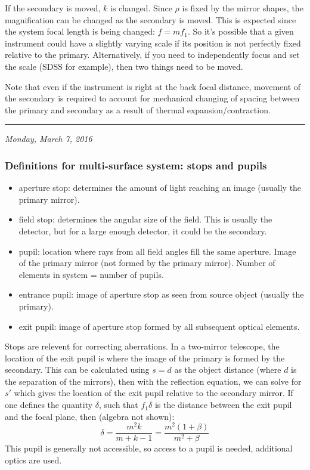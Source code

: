 \documentclass[12pt]{article}
\begin{document}
If the secondary is moved, $k$ is changed. Since $\rho$ is fixed by the
mirror shapes, the magnification can be changed as the secondary is
moved. This is expected since the system focal length is being changed:
$f = mf_{1}$. So it's possible that a given
instrument could have a slightly varying scale if its position is not
perfectly fixed relative to the primary.
Alternatively, if you need to independently focus and set the scale
(SDSS for example), then two things need to be moved.

Note that even if the instrument is right at the back focal
distance, movement of the secondary is required to account for
mechanical changing of spacing between the primary and secondary as a
result of thermal expansion/contraction.

\rule{\textwidth}{0.4pt}

{\small\hfill\emph{Monday, March 7, 2016}}
\subsubsection{Definitions for multi-surface system: stops and pupils}
\begin{itemize}
    \item aperture stop: determines the amount of light reaching an
        image (usually the primary mirror).
    \item field stop: determines the angular size of the field. This
        is usually the detector, but for a large enough detector, it
        could be the secondary.
    \item pupil: location where rays from all field angles fill the
        same aperture. Image of the primary mirror (not formed by
        the primary mirror). Number of elements in system = number
        of pupils.
    \item entrance pupil: image of aperture stop as seen from source
        object (usually the primary).
    \item exit pupil: image of aperture stop formed by all subsequent
        optical elements.
\end{itemize}
Stops are relevent for correcting aberrations.
In a two-mirror telescope, the location of the exit pupil is where the
image of the primary is formed by the secondary. This can be calculated
using $s=d$ as the object distance (where $d$ is the separation of the
mirrors), then with the reflection equation, we can solve for $s'$
which gives the location of the exit pupil relative to the secondary
mirror. If one defines the quantity $\delta$, such that $f_{1}\delta$
is the distance between the exit pupil and the focal plane,
then (algebra not shown):{$$
    \delta = \frac{m^{2}k}{m+k-1} = \frac{m^{2}(1+\beta)}{m^{2}+\beta}
$$}This pupil is generally not accessible, so access to a pupil is
needed, additional optics are used.
\end{document}
